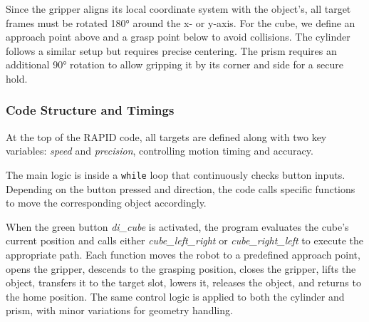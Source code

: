 \documentclass[a4paper,12pt]{article}
\begin{document}
Since the gripper aligns its local coordinate system with the object's, all target frames must be rotated 180° around the x- or y-axis. For the cube, we define an approach point above and a grasp point below to avoid collisions. The cylinder follows a similar setup but requires precise centering. The prism requires an additional 90° rotation to allow gripping it by its corner and side for a secure hold.

\subsubsection{Code Structure and Timings}
At the top of the RAPID code, all targets are defined along with two key variables: \textit{speed} and \textit{precision}, controlling motion timing and accuracy.

The main logic is inside a \texttt{while} loop that continuously checks button inputs. Depending on the button pressed and direction, the code calls specific functions to move the corresponding object accordingly.

When the green button \textit{di\_cube} is activated, the program evaluates the cube’s current position and calls either \textit{cube\_left\_right} or \textit{cube\_right\_left} to execute the appropriate path. Each function moves the robot to a predefined approach point, opens the gripper, descends to the grasping position, closes the gripper, lifts the object, transfers it to the target slot, lowers it, releases the object, and returns to the home position. The same control logic is applied to both the cylinder and prism, with minor variations for geometry handling.
\end{document}
